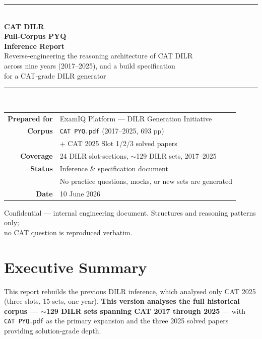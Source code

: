 \documentclass[11pt,a4paper]{article}
\begin{document}
\begin{titlepage}
\thispagestyle{empty}
\vspace*{1.2cm}
\begin{center}
{\color{catblue}\rule{\textwidth}{2pt}}\\[0.5cm]
{\Huge\bfseries\color{catblue} CAT DILR\\[0.2cm] Full-Corpus PYQ\\[0.2cm] Inference Report}\\[0.5cm]
{\large\color{catgray} Reverse-engineering the reasoning architecture of CAT DILR\\ across nine years (2017--2025), and a build specification\\ for a CAT-grade DILR generator}\\[0.4cm]
{\color{catblue}\rule{\textwidth}{2pt}}\\[1.6cm]

\begin{tabular}{rl}
\textbf{Prepared for} & ExamIQ Platform --- DILR Generation Initiative\\[0.3cm]
\textbf{Corpus} & \texttt{CAT PYQ.pdf} (2017--2025, 693 pp)\\
 & + CAT 2025 Slot 1/2/3 solved papers\\[0.15cm]
\textbf{Coverage} & 24 DILR slot-sections, $\sim$129 DILR sets, 2017--2025\\[0.3cm]
\textbf{Status} & Inference \& specification document\\
 & No practice questions, mocks, or new sets are generated\\[0.3cm]
\textbf{Date} & 10 June 2026\\
\end{tabular}

\vfill
{\small\color{catgray} Confidential --- internal engineering document. Structures and reasoning patterns only;\\ no CAT question is reproduced verbatim.}
\end{center}
\end{titlepage}

\tableofcontents
\newpage

\section{Executive Summary}

This report rebuilds the previous DILR inference, which analysed only CAT 2025 (three slots, 15 sets, one year). \textbf{This version analyses the full historical corpus --- $\sim$129 DILR sets spanning CAT 2017 through 2025} --- with \texttt{CAT PYQ.pdf} as the primary expansion and the three 2025 solved papers providing solution-grade depth.
\end{document}
